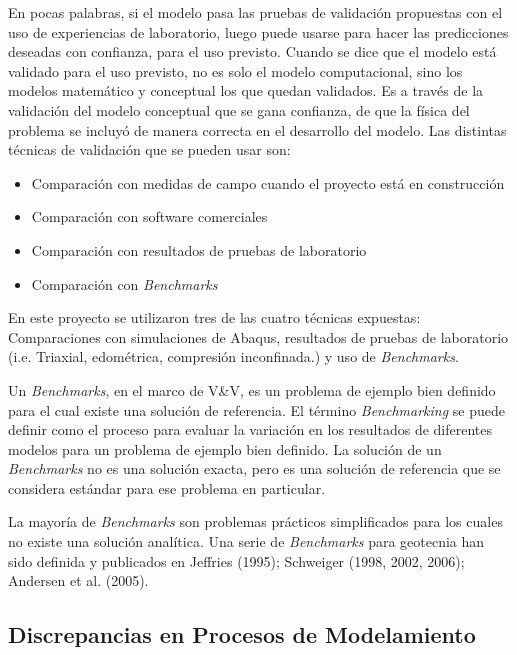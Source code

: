 En pocas palabras, si el modelo pasa las pruebas de validación propuestas con el uso de experiencias de laboratorio, luego puede usarse para hacer las predicciones deseadas con confianza, para el uso previsto. Cuando se dice que el modelo está validado para el uso previsto, no es solo el modelo computacional, sino los modelos matemático y conceptual los que quedan validados. Es a través de la validación del modelo conceptual que se gana confianza, de que la física del problema se incluyó de manera correcta en el desarrollo del modelo. Las distintas técnicas de validación que se pueden usar son:\bigskip

\begin{itemize}
    \item Comparación con medidas de campo cuando el proyecto está en construcción
    \item Comparación con software comerciales
    \item Comparación con resultados de pruebas de laboratorio
    \item Comparación con \textit{Benchmarks}
\end{itemize}

En este proyecto se utilizaron tres de las cuatro técnicas expuestas: Comparaciones con simulaciones de Abaqus, resultados de pruebas de laboratorio (i.e. Triaxial, edométrica, compresión inconfinada.) y uso de \textit{Benchmarks}.\bigskip

Un \textit{Benchmarks}, en el marco de V\&V, es un problema de ejemplo bien definido para el cual existe una solución de referencia. El término \textit{Benchmarking} se puede definir como el proceso para evaluar la variación en los resultados de diferentes modelos para un problema de ejemplo bien definido. La solución de un \textit{Benchmarks} no es una solución exacta, pero es una solución de referencia que se considera estándar para ese problema en particular.\bigskip

La mayoría de \textit{Benchmarks} son problemas prácticos simplificados para los cuales no existe una solución analítica. Una serie de \textit{Benchmarks} para geotecnia han sido definida y publicados en Jeffries (1995); Schweiger (1998, 2002, 2006); Andersen et al. (2005).\bigskip



\subsection{Discrepancias en Procesos de Modelamiento}~\hypertarget{sec:sec234}{}
\label{sec:sec234}

